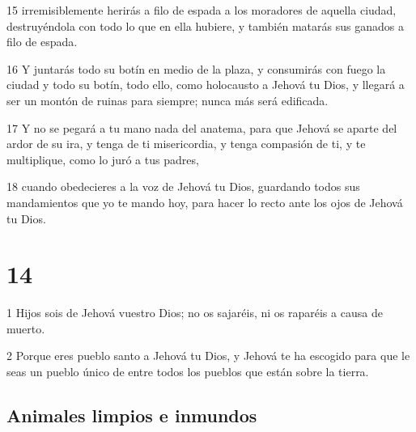 \par 15 irremisiblemente herirás a filo de espada a los moradores de aquella ciudad, destruyéndola con todo lo que en ella hubiere, y también matarás sus ganados a filo de espada.
\par 16 Y juntarás todo su botín en medio de la plaza, y consumirás con fuego la ciudad y todo su botín, todo ello, como holocausto a Jehová tu Dios, y llegará a ser un montón de ruinas para siempre; nunca más será edificada.
\par 17 Y no se pegará a tu mano nada del anatema, para que Jehová se aparte del ardor de su ira, y tenga de ti misericordia, y tenga compasión de ti, y te multiplique, como lo juró a tus padres,
\par 18 cuando obedecieres a la voz de Jehová tu Dios, guardando todos sus mandamientos que yo te mando hoy, para hacer lo recto ante los ojos de Jehová tu Dios.

\chapter{14}

\par 1 Hijos sois de Jehová vuestro Dios; no os sajaréis, ni os raparéis a causa de muerto. 
\par 2 Porque eres pueblo santo a Jehová tu Dios, y Jehová te ha escogido para que le seas un pueblo único de entre todos los pueblos que están sobre la tierra.

\section{Animales limpios e inmundos}

